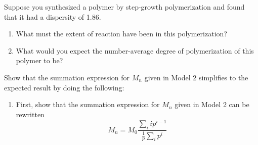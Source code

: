 \begin{activity}
\begin{ctqs}
\begin{solution}[1.5in]
			\end{solution}
			
			
\end{ctqs}

\begin{exercises}

		\exercise Suppose you synthesized a polymer by step-growth polymerization and found that it had a dispersity of 1.86.
		
			\begin{enumerate}
				\item What must the extent of reaction have been in this polymerization?
		
					\begin{solution}
					\end{solution}
					
				\item What would you expect the number-average degree of polymerization of this polymer to be?
		
					\begin{solution}
					\instructordisplay{
						\begin{equation*}
							N_n = \frac{1}{1-p} = \frac{1}{1-0.86} = 7.1
						\end{equation*}
					}
					\end{solution}
			\end{enumerate}
			
		\exercise Show that the summation expression for $M_n$ given in Model 2 simplifies to the expected result by doing the following:
		
			\begin{enumerate}
				\item First, show that the summation expression for $M_n$ given in Model 2 can be rewritten
					\begin{equation*}
						M_n = M_0 \frac{{\sum_i i p^{i-1}}}{\frac{1}{p}\sum_i p^i}
					\end{equation*}
					

\end{enumerate}
\end{exercises}
\end{activity}

